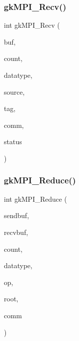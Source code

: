 \mbox{\label{a00359_a4eebc3896a4356902599bd3d3dd077f3}} 
\subsubsection{\texorpdfstring{gk\+M\+P\+I\+\_\+\+Recv()}{gkMPI\_Recv()}}
{\footnotesize\ttfamily int gk\+M\+P\+I\+\_\+\+Recv (\begin{DoxyParamCaption}\item[{void $\ast$}]{buf,  }\item[{\hyperlink{a00876_aaa5262be3e700770163401acb0150f52}{idx\+\_\+t}}]{count,  }\item[{M\+P\+I\+\_\+\+Datatype}]{datatype,  }\item[{\hyperlink{a00876_aaa5262be3e700770163401acb0150f52}{idx\+\_\+t}}]{source,  }\item[{\hyperlink{a00876_aaa5262be3e700770163401acb0150f52}{idx\+\_\+t}}]{tag,  }\item[{M\+P\+I\+\_\+\+Comm}]{comm,  }\item[{M\+P\+I\+\_\+\+Status $\ast$}]{status }\end{DoxyParamCaption})}

\mbox{\label{a00359_ad629e734a85de207a3a6b5b84d6df7e0}} 
\subsubsection{\texorpdfstring{gk\+M\+P\+I\+\_\+\+Reduce()}{gkMPI\_Reduce()}}
{\footnotesize\ttfamily int gk\+M\+P\+I\+\_\+\+Reduce (\begin{DoxyParamCaption}\item[{void $\ast$}]{sendbuf,  }\item[{void $\ast$}]{recvbuf,  }\item[{\hyperlink{a00876_aaa5262be3e700770163401acb0150f52}{idx\+\_\+t}}]{count,  }\item[{M\+P\+I\+\_\+\+Datatype}]{datatype,  }\item[{M\+P\+I\+\_\+\+Op}]{op,  }\item[{\hyperlink{a00876_aaa5262be3e700770163401acb0150f52}{idx\+\_\+t}}]{root,  }\item[{M\+P\+I\+\_\+\+Comm}]{comm }\end{DoxyParamCaption})}


